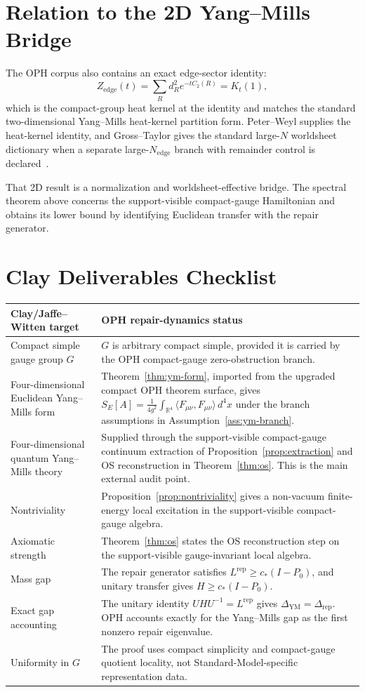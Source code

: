 \documentclass[11pt]{article}
\numberwithin{equation}{section}
\theoremstyle{remark}
\newcommand{\YM}{\mathrm{YM}}
\newcommand{\R}{\mathbb R}
\begin{document}
\section{Relation to the 2D Yang--Mills Bridge}

The OPH corpus also contains an exact edge-sector identity:
\[
Z_{\mathrm{edge}}(t)=\sum_R d_R^2e^{-tC_2(R)}=K_t(1),
\]
which is the compact-group heat kernel at the identity and matches the standard
two-dimensional Yang--Mills heat-kernel partition form. Peter--Weyl supplies the heat-kernel
identity, and Gross--Taylor gives the standard large-\(N\) worldsheet dictionary when a separate
large-\(N_{\mathrm{edge}}\) branch with remainder control is declared~\cite{peter-weyl,gross-taylor}.

That 2D result is a normalization and worldsheet-effective bridge. The spectral theorem above
concerns the support-visible compact-gauge Hamiltonian and obtains its lower bound by identifying
Euclidean transfer with the repair generator.

\section{Clay Deliverables Checklist}

\begin{longtable}{@{}L{0.30\textwidth}L{0.62\textwidth}@{}}
\toprule
Clay/Jaffe--Witten target & OPH repair-dynamics status \\
\midrule
\endhead
Compact simple gauge group \(G\) & \(G\) is arbitrary compact simple, provided it is carried by the OPH compact-gauge zero-obstruction branch. \\
Four-dimensional Euclidean Yang--Mills form & Theorem~\ref{thm:ym-form}, imported from the upgraded compact OPH theorem surface, gives \(S_E[A]=\frac{1}{4g^2}\int_{\R^4}\langle F_{\mu\nu},F_{\mu\nu}\rangle\,d^4x\) under the branch assumptions in Assumption~\ref{ass:ym-branch}. \\
Four-dimensional quantum Yang--Mills theory & Supplied through the support-visible compact-gauge continuum extraction of Proposition~\ref{prop:extraction} and OS reconstruction in Theorem~\ref{thm:os}. This is the main external audit point. \\
Nontriviality & Proposition~\ref{prop:nontriviality} gives a non-vacuum finite-energy local excitation in the support-visible compact-gauge algebra. \\
Axiomatic strength & Theorem~\ref{thm:os} states the OS reconstruction step on the support-visible gauge-invariant local algebra. \\
Mass gap & The repair generator satisfies \(L^{\mathrm{rep}}\ge c_*(I-P_0)\), and unitary transfer gives \(H\ge c_*(I-P_0)\). \\
Exact gap accounting & The unitary identity \(UHU^{-1}=L^{\mathrm{rep}}\) gives \(\Delta_{\YM}=\Delta_{\mathrm{rep}}\). OPH accounts exactly for the Yang--Mills gap as the first nonzero repair eigenvalue. \\
Uniformity in \(G\) & The proof uses compact simplicity and compact-gauge quotient locality, not Standard-Model-specific representation data. \\
\bottomrule
\end{longtable}
\end{document}
